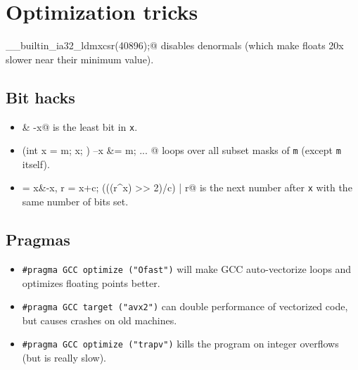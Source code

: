 
\section{Optimization tricks}
	\verb@__builtin_ia32_ldmxcsr(40896);@ disables denormals (which make floats 20x slower near their minimum value).
	\subsection{Bit hacks}
		\begin{itemize}
			\item \verb@x & -x@ is the least bit in \texttt{x}.
			\item \verb@for (int x = m; x; ) { --x &= m; ... }@ loops over all subset masks of \texttt{m} (except \texttt{m} itself).
			\item \verb@c = x&-x, r = x+c; (((r^x) >> 2)/c) | r@ is the next number after \texttt{x} with the same number of bits set.
		\end{itemize}
	\subsection{Pragmas}
		\begin{itemize}
			\item \lstinline{#pragma GCC optimize ("Ofast")} will make GCC auto-vectorize loops and optimizes floating points better.
			\item \lstinline{#pragma GCC target ("avx2")} can double performance of vectorized code, but causes crashes on old machines.
			\item \lstinline{#pragma GCC optimize ("trapv")} kills the program on integer overflows (but is really slow).
		\end{itemize}

